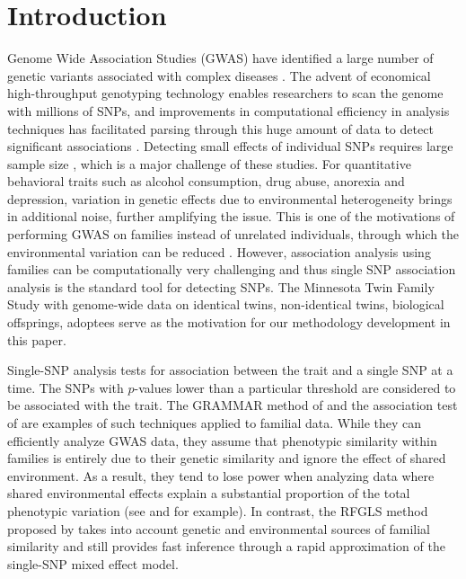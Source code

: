 \section{Introduction}

Genome Wide Association Studies (GWAS) have identified a large number of genetic variants associated with complex diseases \citep{ChangEtal13,WheelerBarroso11}. The advent of economical high-throughput genotyping technology enables researchers to scan the genome with millions of SNPs, and improvements in computational efficiency in analysis techniques has facilitated parsing through this huge amount of data to detect significant associations \citep{VisscherEtal12}. Detecting small effects of individual SNPs requires large sample size \citep{ManolioEtal09}, which is a major challenge of these studies. For quantitative behavioral traits such as alcohol consumption, drug abuse, anorexia and depression, variation in genetic effects due to environmental heterogeneity brings in additional noise, further amplifying the issue. This is one of the motivations of performing GWAS on families instead of unrelated individuals, through which the environmental variation can be reduced \citep{BenyaminEtal09,MillerEtal12,VisscherEtal17}. However, association analysis using families can be computationally very challenging and thus single SNP association analysis is the standard tool for detecting SNPs. The Minnesota Twin Family Study \citep{MillerEtal12} with genome-wide data on identical twins, non-identical twins, biological offsprings, adoptees serve as the motivation for our methodology development in this paper.

Single-SNP analysis tests for association between the trait and a single SNP at a time. The SNPs with $p$-values lower than a particular threshold are considered to be associated with the trait. The GRAMMAR method of \cite{AulchenkoEtal07} and the association test of \cite{ChenAbecasis07} are examples of such techniques applied to familial data. While they can efficiently analyze GWAS data, they assume that phenotypic similarity within families is entirely due to their genetic similarity and ignore the effect of shared environment. As a result, they tend to lose power when analyzing data where shared environmental effects explain a substantial proportion of the total phenotypic variation (see \cite{McGueEtal13} and \cite{DeNeveEtal13} for example). In contrast, the RFGLS method proposed by \cite{LiEtal11} takes into account genetic and environmental sources of familial similarity and still provides fast inference through a rapid approximation of the single-SNP mixed effect model.


